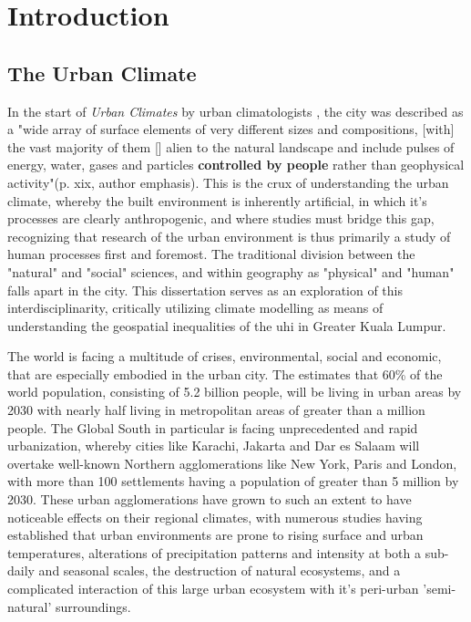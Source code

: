 \section{Introduction}


\subsection{The Urban Climate}

In the start of \textit{Urban Climates} by urban climatologists \textcite{urban_climates}, the city was described as a "wide array of surface elements of very different sizes and compositions, [with] the vast majority of them [] alien to the natural landscape and include pulses of energy, water, gases and particles \textbf{controlled by people} rather than geophysical activity"(p. xix, author emphasis). This is the crux of understanding the urban climate, whereby the built environment is inherently artificial, in which it's processes are clearly anthropogenic, and where studies must bridge this gap, recognizing that research of the urban environment is thus primarily a study of human processes first and foremost. The traditional division between the "natural" and "social" sciences, and within geography as "physical" and "human" falls apart in the city. This dissertation serves as an exploration of this interdisciplinarity, critically utilizing climate modelling as means of understanding the geospatial inequalities of the \Gls{uhi} in Greater Kuala Lumpur.  %

The world is facing a multitude of crises, environmental, social and economic, that are especially embodied in the urban city. The \textcite{un_2018_wup} estimates that 60\% of the world population, consisting of 5.2 billion people, will be living in urban areas by 2030 with nearly half living in metropolitan areas of greater than a million people. The Global South in particular is facing unprecedented and rapid urbanization, whereby cities like Karachi, Jakarta and Dar es Salaam will overtake well-known Northern agglomerations like New York, Paris and London, with more than 100 settlements having a population of greater than 5 million by 2030. These urban agglomerations have grown to such an extent to have noticeable effects on their regional climates, with numerous studies having established that urban environments are prone to rising surface and urban temperatures, alterations of precipitation patterns and intensity at both a sub-daily and seasonal scales, the destruction of natural ecosystems, and a complicated interaction of this large urban ecosystem with it's peri-urban 'semi-natural' surroundings. 

